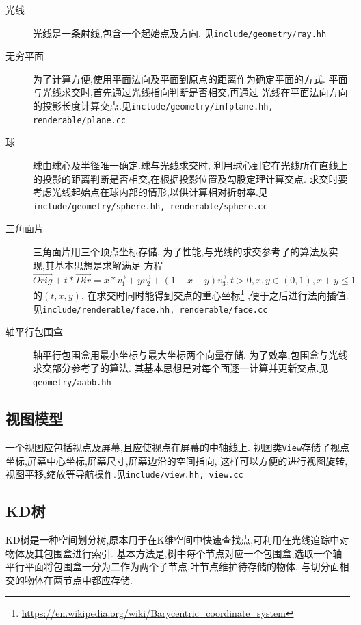 \begin{description}
  \item[光线]光线是一条射线,包含一个起始点及方向. 见\verb|include/geometry/ray.hh|
  \item[无穷平面]
    为了计算方便,使用平面法向及平面到原点的距离作为确定平面的方式.
    平面与光线求交时,首先通过光线指向判断是否相交,再通过
    光线在平面法向方向的投影长度计算交点.见\verb|include/geometry/infplane.hh, renderable/plane.cc|

  \item[球]球由球心及半径唯一确定.球与光线求交时,
    利用球心到它在光线所在直线上的投影的距离判断是否相交,在根据投影位置及勾股定理计算交点.
    求交时要考虑光线起始点在球内部的情形,以供计算相对折射率.见\verb|include/geometry/sphere.hh, renderable/sphere.cc|

  \item[三角面片]三角面片用三个顶点坐标存储.
    为了性能,与光线的求交参考了\cite{triangle, triangle_code}的算法及实现,其基本思想是求解满足
    方程
    \[  \overrightarrow{Orig} + t * \overrightarrow{Dir} = x * \overrightarrow{v_1} + y  \overrightarrow{v_2} + (1 - x -
      y)\overrightarrow{v_3}, t > 0, x, y \in (0, 1), x + y \le 1\]
    的$ (t, x, y)$, 在求交时同时能得到交点的重心坐标\footnote{\url{https://en.wikipedia.org/wiki/Barycentric\_coordinate\_system}}
    ,便于之后进行法向插值.见\verb|include/renderable/face.hh, renderable/face.cc|

  \item[轴平行包围盒]
    轴平行包围盒用最小坐标与最大坐标两个向量存储.
    为了效率,包围盒与光线求交部分参考了\cite{aabb}的算法.
    其基本思想是对每个面逐一计算并更新交点.见\verb|geometry/aabb.hh|
\end{description}


\subsection{视图模型}
一个视图应包括视点及屏幕,且应使视点在屏幕的中轴线上.
视图类\verb|View|存储了视点坐标,屏幕中心坐标,屏幕尺寸,屏幕边沿的空间指向,
这样可以方便的进行视图旋转,视图平移,缩放等导航操作.见\verb|include/view.hh, view.cc|

\subsection{KD树}
KD树是一种空间划分树,原本用于在K维空间中快速查找点,可利用在光线追踪中对物体及其包围盒进行索引.
基本方法是,树中每个节点对应一个包围盒,选取一个轴平行平面将包围盒一分为二作为两个子节点,叶节点维护待存储的物体.
与切分面相交的物体在两节点中都应存储.


